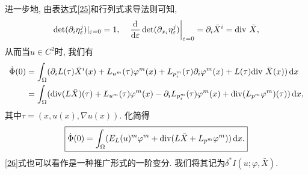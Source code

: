 \documentclass[12pt,a4paper]{article}
\begin{document}
进一步地, 由表达式\eqref{25}和行列式求导法则可知, 
\begin{equation*}
    \det(\partial_i\eta_{\varepsilon}^j)|_{\varepsilon = 0} = 1, \quad \left.\frac{{\rm d}}{{\rm d}\varepsilon}\det(\partial_{x_i}\eta_{\varepsilon}^j)\right|_{\varepsilon = 0} = \partial_i\bar{X}^i = {\rm div}\ \bar{X},
\end{equation*}
从而当$u \in C^2$时, 我们有
\begin{align*}
    \dot\Phi(0) &= \int_{\Omega}(\partial_iL(\tau)\bar{X}^i(x) + L_{u^m}(\tau) \varphi^m(x) + L_{p^m_i}(\tau)\partial_i\varphi^m(x) + L(\tau){\rm div}\ \bar{X}(x)) \,{\rm d}x \\  
    &= \int_{\Omega}({\rm div}(L\bar{X})(\tau) + L_{u^m}(\tau) \varphi^m(x) - \partial_iL_{p_i^m}(\tau)\varphi^m(x) + {\rm div}(L_{p^m} \varphi^m)(\tau)) \,{\rm d}x,
\end{align*}
其中$\tau = (x, u(x), \nabla u(x))$. 化简得 
\begin{equation}\label{26}
    \boxed{\dot \Phi(0) = \int_{\Omega}(E_L(u)^m\varphi^m + {\rm div}(L \bar{X} + L_{p^m}\varphi^m)) \,{\rm d}x.}
\end{equation}
\eqref{26}式也可以看作是一种推广形式的一阶变分. 我们将其记为$\delta^*I(u; \varphi, \bar{X})$.
\end{document}
